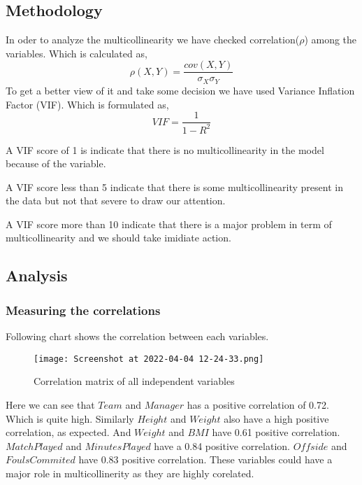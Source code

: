 \documentclass[12pt]{article}
\begin{document}
\subsection{Methodology}
In oder to analyze the multicollinearity we have checked correlation($ \rho $) among the variables. Which is calculated as, $$ \rho(X,Y)=\frac{cov(X,Y)}{\sigma_X\sigma_Y} $$ To get a better view of it and take some decision we have used Variance Inflation Factor (VIF). Which is formulated as, $$ VIF=\frac{1}{1-R^2} $$

A VIF score of 1 is indicate that there is no multicollinearity in the model because of the variable.

A VIF score less than 5 indicate that there is some multicollinearity present in the data but not that severe to draw our attention.

A VIF score more than 10 indicate that there is a major problem in term of multicollinearity and we should take imidiate action. 
\newpage
\subsection{Analysis}
\subsubsection{Measuring the correlations}
 Following chart shows the correlation between each variables.
 \begin{figure}[H]
 	\centering
 	\texttt{[image: Screenshot at 2022-04-04 12-24-33.png]}
 	\caption{ Correlation matrix of all independent variables }
 	\label{fig:1}
 \end{figure} 
 Here we can see that $ Team $ and $ Manager $ has a positive correlation of 0.72. Which is quite high.
 Similarly $ Height $ and $ Weight $ also have a high positive correlation, as expected. And $ Weight $ and $ BMI $ have 0.61 positive correlation.
 $ MatchPlayed $ and $ MinutesPlayed $ have a 0.84 positive correlation.
 $ Offside $ and $ FoulsCommited $ have  0.83 positive correlation.
 These variables could have a major role in multicollinerity as they are highly corelated.
 \newpage
\end{document}
